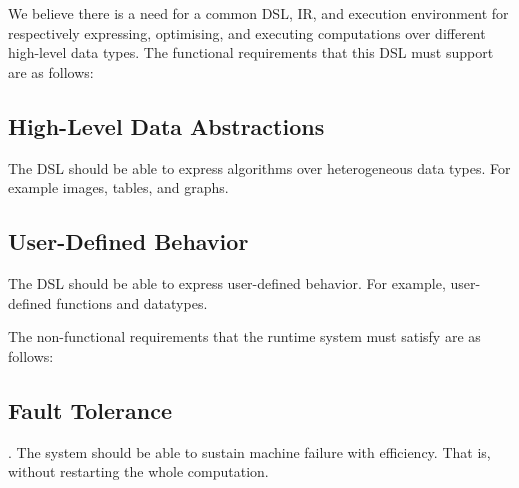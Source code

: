 We believe there is a need for a common DSL, IR, and execution environment for respectively expressing, optimising, and executing computations over different high-level data types. The functional requirements that this DSL must support are as follows:

\subsection{High-Level Data Abstractions}%
\label{sub:High-Level Data Abstractions}

The DSL should be able to express algorithms over heterogeneous data types. For example images, tables, and graphs.

\subsection{User-Defined Behavior}%
\label{sub:User-Defined Behavior}

The DSL should be able to express user-defined behavior. For example, user-defined functions and datatypes.

The non-functional requirements that the runtime system must satisfy are as follows:

\subsection{Fault Tolerance}.
\label{sub:Fault-Tolerence}
The system should be able to sustain machine failure with efficiency. That is, without restarting the whole computation.




